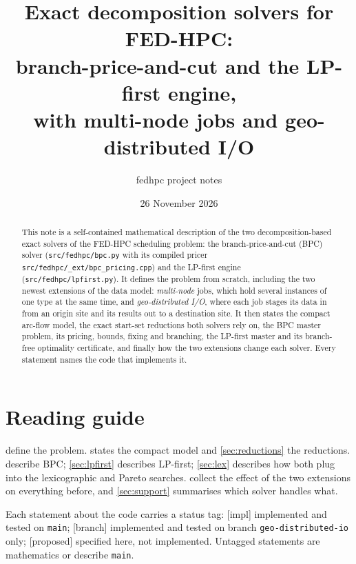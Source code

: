 \documentclass[11pt,a4paper]{article}
\title{Exact decomposition solvers for FED-HPC:\\
branch-price-and-cut and the LP-first engine,\\
with multi-node jobs and geo-distributed I/O}
\author{fedhpc project notes}
\date{26 November 2026}
\theoremstyle{definition}
\theoremstyle{remark}
\newcommand{\code}[1]{\texttt{#1}}
\newcommand{\status}[1]{\textsf{\small[#1]}}
\begin{document}
\maketitle

\begin{abstract}
This note is a self-contained mathematical description of the two
decomposition-based exact solvers of the FED-HPC scheduling problem: the
branch-price-and-cut (BPC) solver (\code{src/fedhpc/bpc.py} with its compiled
pricer \code{src/fedhpc/\_ext/bpc\_pricing.cpp}) and the LP-first engine
(\code{src/fedhpc/lpfirst.py}). It defines the problem from scratch, including
the two newest extensions of the data model: \emph{multi-node} jobs, which hold
several instances of one type at the same time, and \emph{geo-distributed I/O},
where each job stages its data in from an origin site and its results out to a
destination site. It then states the compact arc-flow model, the exact start-set
reductions both solvers rely on, the BPC master problem, its pricing, bounds,
fixing and branching, the LP-first master and its branch-free optimality
certificate, and finally how the two extensions change each solver. Every
statement names the code that implements it.
\end{abstract}

\tableofcontents

\section{Reading guide}\label{sec:guide}

 define the problem.
 states the compact model and \cref{sec:reductions} the
reductions. 
describe BPC; \cref{sec:lpfirst} describes LP-first; \cref{sec:lex} describes
how both plug into the lexicographic and Pareto searches.
 collect the effect of the two extensions on
everything before, and \cref{sec:support} summarises which solver handles what.

Each statement about the code carries a status tag:
\status{impl} implemented and tested on \code{main};
\status{branch} implemented and tested on branch \code{geo-distributed-io} only;
\status{proposed} specified here, not implemented.
Untagged statements are mathematics or describe \code{main}.
\end{document}
